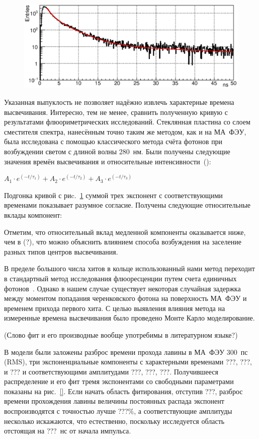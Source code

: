 \begin{figure}
\includegraphics[width=1.0\textwidth]{pictures/WLSdiff_1Nov.eps}
\caption{}
\label{fig:WLSdiff}
\end{figure}

Указанная выпуклость не позволяет надёжно извлечь характерные времена высвечивания. Интересно, тем не менее, сравнить полученную кривую с результатами флюориметрических исследований. Стеклянная пластина со слоем сместителя спектра, нанесённым точно таким же методом, как и на МА~ФЭУ, была исследована с помощью классического метода счёта фотонов при возбуждении светом с длиной волны 280~нм. Были получены следующие значения времён высвечивания и относительные интенсивности~(\cite{DUERR}):

$ A_{1} \cdot e^{(-t / \tau_{1})} + A_{2} \cdot e^{(-t / \tau_{2})} + A_{3} \cdot e^{(-t / \tau_{3})}$

Подгонка кривой с риc.~\ref{fig:WLSdiff} суммой трех экспонент с соответствующими временами показывает разумное согласие. Получены следующие относительные вклады компонент: 


Отметим, что относительный вклад медленной компоненты оказывается ниже, чем в (?), что можно объяснить влиянием способа возбуждения на заселение разных типов центров высвечивания.

В пределе большого числа хитов в кольце использованный нами метод переходит в стандартный метод исследования флюоресценции путем счета единичных фотонов~\cite{}. Однако в нашем случае существует некоторая случайная задержка между моментом попадания черенковского фотона на поверхность МА~ФЭУ и временем прихода первого хита. С целью выявления влияния метода на измеренные времена высвечивания было проведено Монте Карло моделирование.

(Слово фит и его производные вообще употребимы в литературном языке?)

В модели были заложены разброс времени прохода лавины в МА~ФЭУ 300~пс (RMS), три экспоненциальные компоненты с характерными временами ???, ???, и ??? и соответствующими амплитудами ???, ???, ???. Получившееся распределение и его фит тремя экспонентами со свободными параметрами показаны на рис.~\ref{}. Если начать область фитирования, отступив ???, разброс времени прохождения лавины величины постоянных распада экспонент воспроизводятся с точностью лучше ???\%, а соответствующие амплитуды несколько искажаются, что естественно, поскольку исследуется область отстоящая на ???~нс от начала импульса.

